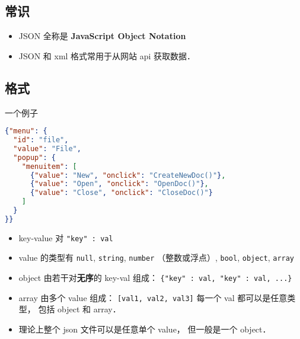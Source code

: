 
\begin{issues}
\issueDraft
\end{issues}

\subsection{常识}
\begin{itemize}
\item JSON 全称是 \textbf{JavaScript Object Notation}
\item JSON 和 xml 格式常用于从网站 api 获取数据．
\end{itemize}

\subsection{格式}
一个例子
\begin{lstlisting}[language=json]
{"menu": {
  "id": "file",
  "value": "File",
  "popup": {
    "menuitem": [
      {"value": "New", "onclick": "CreateNewDoc()"},
      {"value": "Open", "onclick": "OpenDoc()"},
      {"value": "Close", "onclick": "CloseDoc()"}
    ]
  }
}}
\end{lstlisting}

\begin{itemize}
\item key-value 对 \verb|"key" : val|
\item value 的类型有 \verb|null|, \verb|string|, \verb|number| （整数或浮点）, \verb|bool|, \verb|object|, \verb|array|
\item object 由若干对\textbf{无序}的 key-val 组成： \verb|{"key" : val, "key" : val, ...}|
\item array 由多个 value 组成： \verb|[val1, val2, val3]| 每一个 val 都可以是任意类型， 包括 object 和 array．
\item 理论上整个 json 文件可以是任意单个 value， 但一般是一个 object．
\end{itemize}
